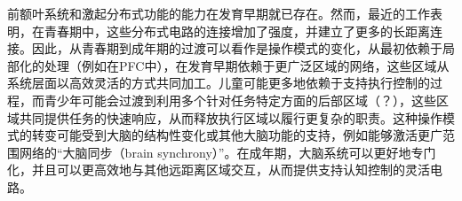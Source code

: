 前额叶系统和激起分布式功能的能力在发育早期就已存在。然而，最近的工作表明，在青春期中，这些分布式电路的连接增加了强度，并建立了更多的长距离连接。因此，从青春期到成年期的过渡可以看作是操作模式的变化，从最初依赖于局部化的处理（例如在PFC中），在发育早期依赖于更广泛区域的网络，这些区域从系统层面以高效灵活的方式共同加工。儿童可能更多地依赖于支持执行控制的过程，而青少年可能会过渡到利用多个针对任务特定方面的后部区域（？），这些区域共同提供任务的快速响应，从而释放执行区域以履行更复杂的职责。这种操作模式的转变可能受到大脑的结构性变化或其他大脑功能的支持，例如能够激活更广范围网络的“大脑同步（brain synchrony）”。在成年期，大脑系统可以更好地专门化，并且可以更高效地与其他远距离区域交互，从而提供支持认知控制的灵活电路。


